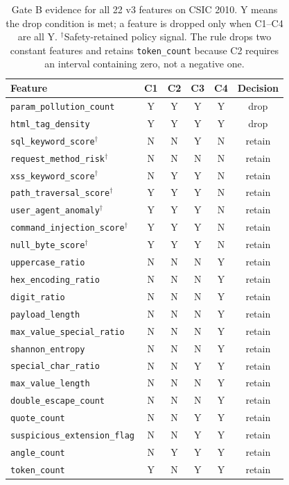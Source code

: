 \documentclass[conference]{IEEEtran}
\newcommand{\feat}[1]{\texttt{#1}}
\begin{document}
\begin{table}[t]
\caption{Gate B evidence for all 22 v3 features on CSIC 2010. Y means the drop condition is met; a feature is dropped only when C1--C4 are all Y. $^{\dagger}$Safety-retained policy signal. The rule drops two constant features and retains \feat{token\_count} because C2 requires an interval containing zero, not a negative one.}
\label{tab:evidence}
\centering
\scriptsize
\setlength{\tabcolsep}{3pt}
\begin{tabular}{@{}lccccc@{}}
\toprule
Feature & C1 & C2 & C3 & C4 & Decision\\
\midrule
\feat{param\_pollution\_count} & Y & Y & Y & Y & drop\\
\feat{html\_tag\_density} & Y & Y & Y & Y & drop\\
\midrule
\feat{sql\_keyword\_score}$^{\dagger}$ & N & N & Y & N & retain\\
\feat{request\_method\_risk}$^{\dagger}$ & N & N & N & N & retain\\
\feat{xss\_keyword\_score}$^{\dagger}$ & N & Y & Y & N & retain\\
\feat{path\_traversal\_score}$^{\dagger}$ & Y & Y & Y & N & retain\\
\feat{user\_agent\_anomaly}$^{\dagger}$ & Y & Y & Y & N & retain\\
\feat{command\_injection\_score}$^{\dagger}$ & Y & Y & Y & N & retain\\
\feat{null\_byte\_score}$^{\dagger}$ & Y & Y & Y & N & retain\\
\midrule
\feat{uppercase\_ratio} & N & N & N & Y & retain\\
\feat{hex\_encoding\_ratio} & N & N & N & Y & retain\\
\feat{digit\_ratio} & N & N & N & Y & retain\\
\feat{payload\_length} & N & N & N & Y & retain\\
\feat{max\_value\_special\_ratio} & N & N & N & Y & retain\\
\feat{shannon\_entropy} & N & N & N & Y & retain\\
\feat{special\_char\_ratio} & N & N & Y & Y & retain\\
\feat{max\_value\_length} & N & N & N & Y & retain\\
\feat{double\_escape\_count} & N & N & N & Y & retain\\
\feat{quote\_count} & N & N & Y & Y & retain\\
\feat{suspicious\_extension\_flag} & N & N & Y & Y & retain\\
\feat{angle\_count} & N & Y & Y & Y & retain\\
\feat{token\_count} & Y & N & Y & Y & retain\\
\bottomrule
\end{tabular}
\end{table}
\end{document}
